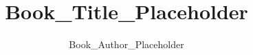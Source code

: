 \documentclass[12pt,a4paper,oneside]{book}
\begin{document}
\title{{\myfont Book_Title_Placeholder}}
\author{{\Huge Book_Author_Placeholder}}
\maketitle
\tableofcontents
\newpage
\end{document}
